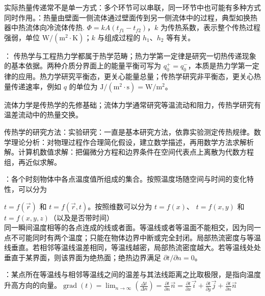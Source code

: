 实际热量传递常不是单一方式：多个环节可以串联，同一环节中也可能有多种方式同时作用。：热量由壁面一侧流体通过壁面传到另一侧流体中的过程，典型如换热器中热流体向冷流体传热. $\Phi=kA(t_{f1}-t_{f2})$，$k$ 为传热系数，表示整个传热过程强弱，单位 $\mathrm{W}/(\mathrm{m}^2\cdot\mathrm{K})$；$k$ 与组成过程的 $h_1$、$h_2$ 等有关。

： 传热学与工程热力学都属于热学范畴；热力学第一定律是研究一切热传递现象的基本依据。两种介质分界面上的能量平衡可写为 $q_0^+=q_0^-$，本质是热力学第一定律的应用。热力学研究平衡态，更关心能量总量；传热学研究非平衡态，更关心热量传递速率，例如 $q$ 的单位为 $\mathrm{J}/(\mathrm{m}^2\cdot\mathrm{s})=\mathrm{W}/\mathrm{m}^2$。

流体力学是传热学的先修基础；流体力学通常研究等温流动和阻力，传热学研究有温差流动中的热量交换。

传热学的研究方法：实验研究：一直是基本研究方法，依靠实验测定传热规律。数学理论分析：对物理过程作合理简化假设，建立数学描述，再用数学方法求解析解。计算机数值求解：把偏微分方程和边界条件在空间代表点上离散为代数方程组，再近似求解。

\divider


：各个时刻物体中各点温度值所组成的集合。按照温度场随空间与时间的变化特性，可以分为

 $t=f(\vec{r})$ 和  $t=f(\vec{r},t)$。按照维数可以分为  $t=f(x)$、 $t=f(x,y)$ 和  $t=f(x,y,z)$（以及是否带时间）\\

同一瞬间温度相等的各点连成的线或者面。等温线或者等温面不能相交，因为同一点不可能同时有两个温度；只能在物体边界中断或完全封闭。局部热流密度与等温线垂直。若相邻等温线温差相同，等温线越密，局部热流密度越大。若等温线处处垂直于某界面，则该界面为绝热面；绝热边界满足 $\partial t/\partial n=0$。

：某点所在等温线与相邻等温线之间的温差与其法线距离之比取极限，是指向温度升高方向的向量。$\operatorname{grad}(t)=\lim_{n\to \infty}\left(\frac{\Delta t}{\Delta n}\right)=\frac{\partial t}{\partial n}\vec{n}=\frac{\partial t}{\partial x}\vec{i}+\frac{\partial t}{\partial y}\vec{j}+\frac{\partial t}{\partial n}\vec{n}$

\divider